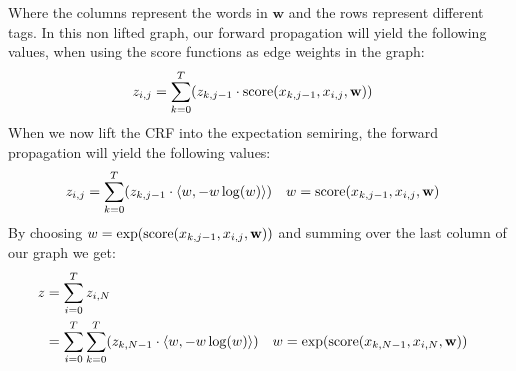 \documentclass[a4paper,12pt]{ETHexercise}
\begin{document}
\begin{question}
\begin{subquestion}
\begin{figure}[H]
    \end{figure}
    Where the columns represent the words in $\mathbf{w}$ and the rows represent different tags.
    In this non lifted graph, our forward propagation will yield the following values, when using the score functions as edge weights in the graph:
    \begin{align}
      z_{i,j} & = \sum_{k=0}^{T} (z_{k,j-1} \cdot \text{score}(x_{k, j-1}, x_{i,j}, \mathbf{w}))
    \end{align}
    When we now lift the CRF into the expectation semiring, the forward propagation will yield the following values:
    \begin{align}
      z_{i,j} & = \sum_{k=0}^{T} (z_{k,j-1} \cdot {\langle w , -w \log(w) \rangle}) &  & w = \text{score}(x_{k,j-1}, x_{i,j}, \mathbf{w})
    \end{align}
    By choosing $w = \exp(\text{score}(x_{k,j-1}, x_{i,j}, \mathbf{w}))$ and summing over the last column of our graph we get:
    \begin{align}
      z & = \sum_{i=0}^{T} z_{i,N}                                                                                         \\
        & = \sum_{i=0}^{T} \sum_{k=0}^{T} (z_{k,N-1} \cdot {\langle w , -w \log(w) \rangle}) &  & w = \exp(\text{score}(x_{k,N-1}, x_{i,N}, \mathbf{w})) \\
    \end{align}
  \end{subquestion}
\end{question}
\end{document}
